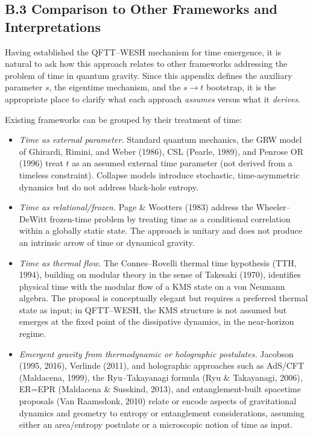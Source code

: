 \documentclass[12pt,a4paper]{article}
\numberwithin{equation}{section}
\begin{document}
\vspace{0.8cm}

\subsection*{B.3 Comparison to Other Frameworks and Interpretations}

\vspace{0.5cm}

Having established the QFTT--WESH mechanism for time emergence, it is natural to ask how this approach relates to other frameworks addressing the problem of time in quantum gravity. Since this appendix defines the auxiliary parameter $s$, the eigentime mechanism, and the $s \to t$ bootstrap, it is the appropriate place to clarify what each approach \emph{assumes} versus what it \emph{derives}.

\vspace{0.3cm}
\noindent Existing frameworks can be grouped by their treatment of time:

\begin{itemize}[leftmargin=1.2cm, itemsep=0.15cm]
\item[\textbf{(A)}] \textit{Time as external parameter.} Standard quantum mechanics, the GRW model of Ghirardi, Rimini, and Weber (1986), CSL (Pearle, 1989), and Penrose OR (1996) treat $t$ as an assumed external time parameter (not derived from a timeless constraint). Collapse models introduce stochastic, time-asymmetric dynamics but do not address black-hole entropy.

\item[\textbf{(B)}] \textit{Time as relational/frozen.} Page \& Wootters (1983) address the Wheeler--DeWitt frozen-time problem by treating time as a conditional correlation within a globally static state. The approach is unitary and does not produce an intrinsic arrow of time or dynamical gravity.

\item[\textbf{(B$'$)}] \textit{Time as thermal flow.} The Connes--Rovelli thermal time hypothesis (TTH, 1994), building on modular theory in the sense of Takesaki (1970), identifies physical time with the modular flow of a KMS state on a von Neumann algebra. The proposal is conceptually elegant but requires a preferred thermal state as input; in QFTT--WESH, the KMS structure is not assumed but emerges at the fixed point of the dissipative dynamics, in the near-horizon regime.

\item[\textbf{(C)}] \textit{Emergent gravity from thermodynamic or holographic postulates.} Jacobson (1995, 2016), Verlinde (2011), and holographic approaches such as AdS/CFT (Maldacena, 1999), the Ryu--Takayanagi formula (Ryu \& Takayanagi, 2006), ER=EPR (Maldacena \& Susskind, 2013), and entanglement-built spacetime proposals (Van Raamsdonk, 2010) relate or encode aspects of gravitational dynamics and geometry to entropy or entanglement considerations, assuming either an area/entropy postulate or a microscopic notion of time as input.
\end{itemize}
\end{document}
